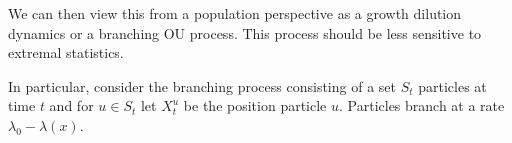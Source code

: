 \documentclass[11pt]{article}
\begin{document}
We can then view this from a population perspective as a growth dilution dynamics or a branching OU process. This process should be less sensitive to extremal statistics. 

In particular, consider the branching process consisting of a set $S_t$ particles at time $t$ and for $u \in S_t$ let $X_t^u$ be the position particle $u$. Particles branch at a rate $\lambda_0-  \lambda(x)$. 
\end{document}

